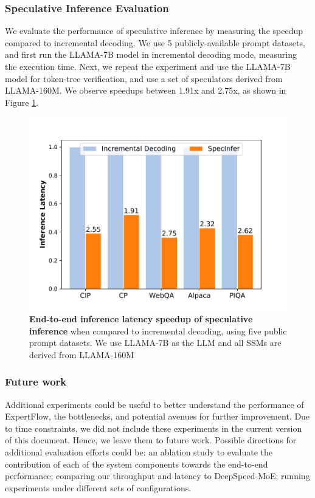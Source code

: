 \subsubsection{Speculative Inference Evaluation}
We evaluate the performance of speculative inference by measuring the speedup compared to incremental decoding. We use 5 publicly-available prompt datasets, and first run the LLAMA-7B model in incremental decoding mode, measuring the execution time. Next, we repeat the experiment and use the LLAMA-7B model for token-tree verification, and use a set of speculators derived from LLAMA-160M. We observe speedups between 1.91x and 2.75x, as shown in Figure \ref{fig:latency}.

\begin{figure}
    \centering
    \includegraphics[scale=0.45]{figures/latency_improvement.pdf}
    \caption{\textbf{End-to-end inference latency speedup of speculative inference} when compared to incremental decoding, using five public prompt datasets. We use LLAMA-7B as the LLM and all SSMs are derived from LLAMA-160M}
    \label{fig:latency}
\end{figure}

\subsubsection{Future work}
Additional experiments could be useful to better understand the performance of ExpertFlow, the bottlenecks, and potential avenues for further improvement. Due to time constraints, we did not include these experiments in the current version of this document. Hence, we leave them to future work. Possible directions for additional evaluation efforts could be: an ablation study to evaluate the contribution of each of the system components towards the end-to-end performance; comparing our throughput and latency to DeepSpeed-MoE; running experiments under different sets of configurations. 

